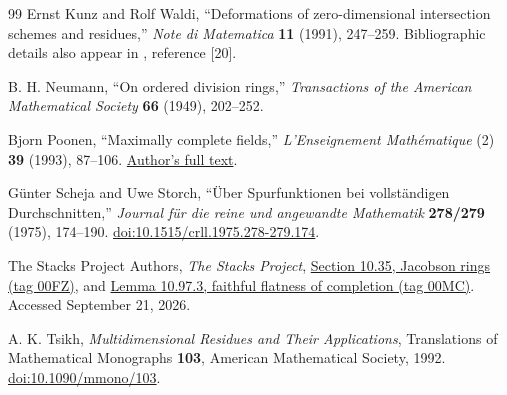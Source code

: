 \documentclass[11pt,letterpaper]{article}
\theoremstyle{definition}
\theoremstyle{remark}
\numberwithin{equation}{section}
\begin{document}
\begin{thebibliography}{99}
Ernst Kunz and Rolf Waldi,
``Deformations of zero-dimensional intersection schemes and residues,''
\emph{Note di Matematica} \textbf{11} (1991), 247--259.
Bibliographic details also appear in \cite{CDS}, reference [20].

B. H. Neumann,
``On ordered division rings,''
\emph{Transactions of the American Mathematical Society} \textbf{66} (1949), 202--252.

Bjorn Poonen,
``Maximally complete fields,''
\emph{L'Enseignement Math\'ematique} (2) \textbf{39} (1993), 87--106.
\href{https://math.mit.edu/~poonen/papers/amsval.pdf}{Author's full text}.

G\"unter Scheja and Uwe Storch,
``\"Uber Spurfunktionen bei vollst\"andigen Durchschnitten,''
\emph{Journal f\"ur die reine und angewandte Mathematik} \textbf{278/279} (1975), 174--190.
\href{https://doi.org/10.1515/crll.1975.278-279.174}{doi:10.1515/crll.1975.278-279.174}.

The Stacks Project Authors,
\emph{The Stacks Project},
\href{https://stacks.math.columbia.edu/tag/00FZ}{Section 10.35, Jacobson rings (tag 00FZ)},
and \href{https://stacks.math.columbia.edu/tag/00MC}{Lemma 10.97.3, faithful flatness of completion (tag 00MC)}.
Accessed September 21, 2026.

A. K. Tsikh,
\emph{Multidimensional Residues and Their Applications},
Translations of Mathematical Monographs \textbf{103}, American Mathematical Society, 1992.
\href{https://doi.org/10.1090/mmono/103}{doi:10.1090/mmono/103}.

\end{thebibliography}
\end{document}
